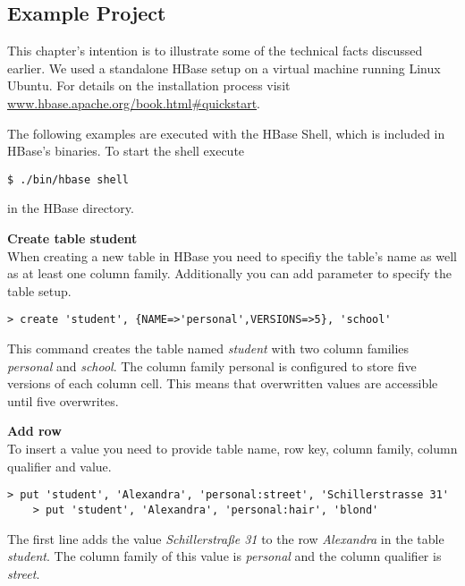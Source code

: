 
\subsection{Example Project}
\label{lblHBaseExample}

This chapter's intention is to illustrate some of the technical facts discussed earlier. We used a standalone HBase setup on a virtual machine running Linux Ubuntu. For details on the installation process visit \href{www.hbase.apache.org/book.html\#quickstart}{www.hbase.apache.org/book.html\#quickstart}.

The following examples are executed with the HBase Shell, which is included in HBase's binaries. To start the shell execute 
\begin{lstlisting}[caption={start HBase shell},label=lst:hbas_shell]
	$ ./bin/hbase shell
\end{lstlisting}
in the HBase directory. 

\textbf{Create table student} \\
When creating a new table in HBase you need to specifiy the table's name as well as at least one column family. Additionally you can add parameter to specify the table setup. 
\begin{lstlisting}[caption={create table},label=lst:create_table]
	> create 'student', {NAME=>'personal',VERSIONS=>5}, 'school'
\end{lstlisting}
This command creates the table named \textit{student} with two column families \textit{personal} and \textit{school}. The column family personal is configured to store five versions of each column cell. This means that overwritten values are accessible until five overwrites. 

\textbf{Add row} \\
To insert a value you need to provide table name, row key, column family, column qualifier and value. 

\begin{lstlisting}[caption={insert values},label=lst:insert_values]
	> put 'student', 'Alexandra', 'personal:street', 'Schillerstrasse 31'
	> put 'student', 'Alexandra', 'personal:hair', 'blond'
\end{lstlisting}

The first line adds the value \textit{Schillerstraße 31} to the row \textit{Alexandra} in the table \textit{student}. The column family of this value is \textit{personal} and the column qualifier is \textit{street}. 

